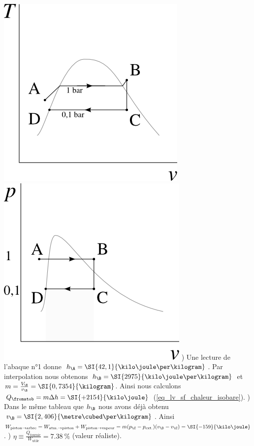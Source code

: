 \begin{description}
			\includegraphics[width=\solutiondiagramwidth]{images/exo_sol_tv_newcomen.png}
			\includegraphics[width=\solutiondiagramwidth]{images/exo_sol_pv_newcomen.png}
			) Une lecture de l’abaque n°1 donne $h_\A = \SI{42,1}{\kilo\joule\per\kilogram}$. Par interpolation nous obtenons $h_\B = \SI{2975}{\kilo\joule\per\kilogram}$ et $m = \frac{V_\B}{v_\B} = \SI{0,7354}{\kilogram}$. Ainsi nous calculons ${Q}_\fromatob = m \Delta h = \SI{+2154}{\kilo\joule}$ (\ref{eq_lv_sf_chaleur_isobare}).
			) Dans le même tableau que $h_\B$ nous avons déjà obtenu $v_\B = \SI{2,406}{\metre\cubed\per\kilogram}$. Ainsi ${W}_{\text{piston} \to \text{arbre}} = W_{\text{atm.} \to \text{piston}} + W_{\text{piston} \to \text{vapeur}} = m (p_\C - p_\text{ext.}) (v_\D - v_\C) = \SI{-159}{\kilo\joule}$.
			) $\eta \equiv \frac{Q_\text{fournie}}{W_\text{utile}} = \SI{7,38}{\percent}$ (valeur réaliste).

\end{description}
